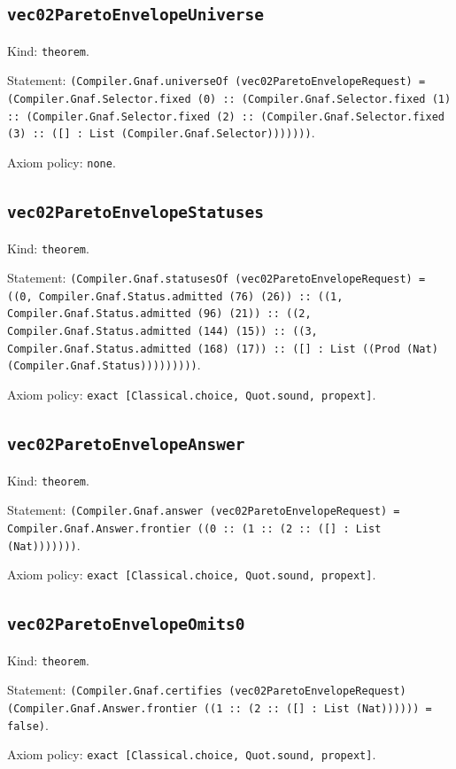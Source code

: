 \documentclass[11pt]{article}
\begin{document}
\subsection*{\texttt{vec02ParetoEnvelopeUniverse}}
\noindent Kind: \texttt{theorem}.\par
\noindent Statement: \texttt{(Compiler.Gnaf.universeOf (vec02ParetoEnvelopeRequest) = (Compiler.Gnaf.Selector.fixed (0) :: (Compiler.Gnaf.Selector.fixed (1) :: (Compiler.Gnaf.Selector.fixed (2) :: (Compiler.Gnaf.Selector.fixed (3) :: ([] : List (Compiler.Gnaf.Selector)))))))}.\par
\noindent Axiom policy: \texttt{none}.\par
\subsection*{\texttt{vec02ParetoEnvelopeStatuses}}
\noindent Kind: \texttt{theorem}.\par
\noindent Statement: \texttt{(Compiler.Gnaf.statusesOf (vec02ParetoEnvelopeRequest) = ((0, Compiler.Gnaf.Status.admitted (76) (26)) :: ((1, Compiler.Gnaf.Status.admitted (96) (21)) :: ((2, Compiler.Gnaf.Status.admitted (144) (15)) :: ((3, Compiler.Gnaf.Status.admitted (168) (17)) :: ([] : List ((Prod (Nat) (Compiler.Gnaf.Status)))))))))}.\par
\noindent Axiom policy: \texttt{exact [Classical.choice, Quot.sound, propext]}.\par
\subsection*{\texttt{vec02ParetoEnvelopeAnswer}}
\noindent Kind: \texttt{theorem}.\par
\noindent Statement: \texttt{(Compiler.Gnaf.answer (vec02ParetoEnvelopeRequest) = Compiler.Gnaf.Answer.frontier ((0 :: (1 :: (2 :: ([] : List (Nat)))))))}.\par
\noindent Axiom policy: \texttt{exact [Classical.choice, Quot.sound, propext]}.\par
\subsection*{\texttt{vec02ParetoEnvelopeOmits0}}
\noindent Kind: \texttt{theorem}.\par
\noindent Statement: \texttt{(Compiler.Gnaf.certifies (vec02ParetoEnvelopeRequest) (Compiler.Gnaf.Answer.frontier ((1 :: (2 :: ([] : List (Nat)))))) = false)}.\par
\noindent Axiom policy: \texttt{exact [Classical.choice, Quot.sound, propext]}.\par
\end{document}
